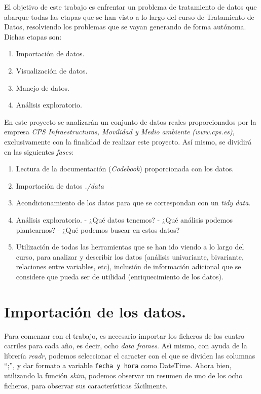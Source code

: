 \documentclass[]{article}
\providecommand{\tightlist}{%
  \setlength{\itemsep}{0pt}\setlength{\parskip}{0pt}}
\begin{document}
El objetivo de este trabajo es enfrentar un problema de tratamiento de
datos que abarque todas las etapas que se han visto a lo largo del curso
de Tratamiento de Datos, resolviendo los problemas que se vayan
generando de forma autónoma. Dichas etapas son:

\begin{enumerate}
\def\labelenumi{\arabic{enumi}.}
\tightlist
\item
  Importación de datos.
\item
  Visualización de datos.
\item
  Manejo de datos.
\item
  Análisis exploratorio.
\end{enumerate}

En este proyecto se analizarán un conjunto de datos reales
proporcionados por la empresa \emph{CPS Infraestructuras, Movilidad y
Medio ambiente (www.cps.es)}, exclusivamente con la finalidad de
realizar este proyecto. Así mismo, se dividirá en las siguientes
\emph{fases}:

\begin{enumerate}
\def\labelenumi{\arabic{enumi}.}
\setcounter{enumi}{-1}
\tightlist
\item
  Lectura de la documentación (\emph{Codebook}) proporcionada con los
  datos.
\item
  Importación de datos \emph{./data}
\item
  Acondicionamiento de los datos para que se correspondan con un
  \emph{tidy data}.
\item
  Análisis exploratorio. - ¿Qué datos tenemos? - ¿Qué análisis podemos
  plantearnos? - ¿Qué podemos buscar en estos datos?
\item
  Utilización de todas las herramientas que se han ido viendo a lo largo
  del curso, para analizar y describir los datos (análisis univariante,
  bivariante, relaciones entre variables, etc), inclusión de información
  adicional que se considere que pueda ser de utilidad (enriquecimiento
  de los datos).
\end{enumerate}

\section{Importación de los datos.}\label{importacion-de-los-datos.}

Para comenzar con el trabajo, es necesario importar los ficheros de los
cuatro carriles para cada año, es decir, ocho \emph{data frames}. Asì
mismo, con ayuda de la librería \emph{readr}, podemos seleccionar el
caracter con el que se dividen las columnas ``;'', y dar formato a
variable \texttt{fecha\ y\ hora} como DateTime. Ahora bien, utilizando
la función \emph{skim}, podemos observar un resumen de uno de los ocho
ficheros, para observar sus características fácilmente.
\end{document}
